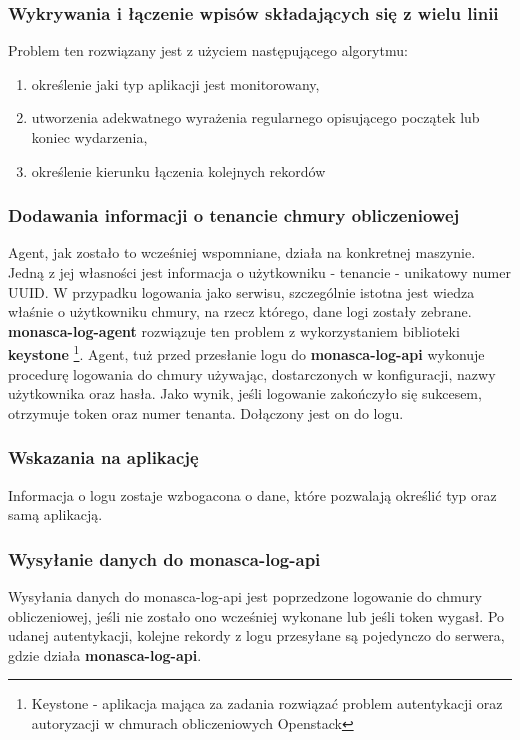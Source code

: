         \subsubsection{Wykrywania i łączenie wpisów składających się z wielu linii}
            Problem ten rozwiązany jest z użyciem następującego algorytmu:
            \begin{enumerate}
                \item określenie jaki typ aplikacji jest monitorowany,
                \item utworzenia adekwatnego wyrażenia regularnego opisującego początek lub koniec wydarzenia,
                \item określenie kierunku łączenia kolejnych rekordów
            \end{enumerate}
            
        \subsubsection{Dodawania informacji o tenancie chmury obliczeniowej}
            Agent, jak zostało to wcześniej wspomniane, działa na konkretnej maszynie. Jedną z jej własności jest
            informacja o użytkowniku - tenancie - unikatowy numer UUID. W przypadku logowania jako serwisu,
            szczególnie istotna jest wiedza właśnie o użytkowniku chmury, na rzecz którego, dane logi zostały
            zebrane. \textbf{monasca-log-agent} rozwiązuje ten problem z wykorzystaniem biblioteki \textbf{keystone}
            \footnote{Keystone - aplikacja mająca za zadania rozwiązać problem autentykacji oraz autoryzacji w
                chmurach obliczeniowych Openstack}. 
            Agent, tuż przed przesłanie logu do \textbf{monasca-log-api} wykonuje procedurę logowania do chmury
            używając, dostarczonych w konfiguracji, nazwy użytkownika oraz hasła. Jako wynik, jeśli logowanie 
            zakończyło się sukcesem, otrzymuje token oraz numer tenanta. Dołączony jest on do logu.
            
        \subsubsection{Wskazania na aplikację}
            Informacja o logu zostaje wzbogacona o dane, które pozwalają określić typ oraz samą aplikacją.
            
         \subsubsection{Wysyłanie danych do monasca-log-api}
             Wysyłania danych do monasca-log-api jest poprzedzone logowanie do chmury obliczeniowej, jeśli nie
             zostało ono wcześniej wykonane lub jeśli token wygasł. Po udanej autentykacji, kolejne rekordy
             z logu przesyłane są pojedynczo do serwera, gdzie działa \textbf{monasca-log-api}.